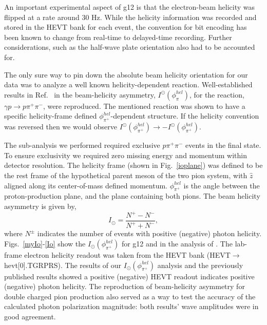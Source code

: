 An important experimental aspect of g12 is that the electron-beam helicity was flipped at a rate around 30 Hz. While the helicity information was recorded and stored in the HEVT bank for each event, the convention for bit encoding has been known to change from real-time to delayed-time recording. Further considerations, such as the half-wave plate orientation also had to be accounted for.

The only sure way to pin down the absolute beam helicity orientation for our data was to analyze a well known helicity-dependent reaction. Well-established results in Ref.~\cite{Io} in the beam-helicity asymmetry, $I^\odot(\phi^{hel}_\pi)$, for the reaction, $\gamma p \to p \pi^+ \pi^-$, were reproduced.  The mentioned reaction was shown to have a specific helicity-frame defined $\phi^{hel}_{\pi^+}$-dependent structure.  If the helicity convention was reversed then we would observe $I^\odot(\phi^{hel}_{\pi^+}) \to -I^\odot(\phi^{hel}_{\pi^+})$.

The sub-analysis we performed required exclusive $p \pi^+ \pi^-$ events in the final state. To ensure exclusivity we required zero missing energy and momentum within detector resolution. The helicity frame (shown in Fig.~\ref{ioplane}) was defined to be the rest frame of the hypothetical parent meson of the two pion system, with  $\hat{z}$ aligned along its center-of-mass defined momentum. $\phi^{hel}_{\pi^+}$ is the angle between the proton-production plane, and the plane containing both pions. The beam helicity asymmetry is given by,
\begin{equation}
I_\odot = \frac{N^+ - N^-}{N^+ + N^-},
\end{equation}
where $N^\pm$ indicates the number of events with positive (negative) photon helicity.  Figs.~\ref{myIo}-\ref{Io} show the $I_{\odot}(\phi^{hel}_{\pi^+})$ for g12 and in the analysis of \cite{Io}.
The lab-frame electron helicity readout was taken from the HEVT bank (HEVT$\to$hevt[0].TGRPRS). The results of our $I_{\odot}(\phi^{hel}_{\pi^+})$ analysis and the previously published results showed a positive (negative) HEVT readout indicates positive (negative) photon helicity. The reproduction of beam-helicity asymmetry for double charged pion production also served as a way to test the accuracy of the calculated photon polarization magnitude: both results' wave amplitudes were in good agreement.

